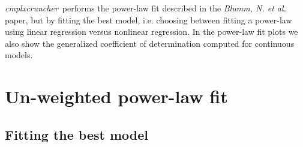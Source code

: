 \documentclass[12pt,oneside,letterpaper]{article}
\newcommand{\CC}[0]{\emph{cmplxcruncher}}
\begin{document}
\CC\ performs the power-law fit described in the \emph{Blumm, N. et al.} paper, but by fitting the best model, i.e. choosing between fitting a power-law using linear regression versus nonlinear regression\cite{ecology}. In the power-law fit plots we also show the generalized coefficient of determination computed for continuous models\cite{genR2,disR2}.

\section{Un-weighted power-law fit}\label{sec:unw}

\subsection{Fitting the best model}
\end{document}
